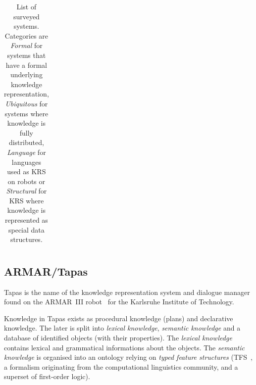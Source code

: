 \documentclass[a4paper, twocolumn]{article}
\begin{document}
\begin{landscape}
\begin{table}
\begin{center}
\begin{tabular}{p{2.2cm}p{1.6cm}p{4cm}lp{2.4cm}p{3.4cm}p{1.5cm}}

\bottomrule

\end{tabular}
\end{center}

\caption{List of surveyed systems. Categories are \emph{Formal} for systems
that have a formal underlying knowledge representation, \emph{Ubiquitous} for
systems where knowledge is fully distributed, \emph{Language} for languages
used as KRS on robots or \emph{Structural} for KRS where knowledge is
represented as special data structures.}

\label{table|surveyed-systems}
\end{table}
\end{landscape}


\subsection{ARMAR/Tapas}

{\sc Tapas} is the name of the knowledge representation system and dialogue
manager found on the ARMAR~III robot~\cite{Holzapfel2008} for the Karlsruhe
Institute of Technology.

Knowledge in {\sc Tapas} exists as procedural knowledge (plans) and declarative
knowledge. The later is split into \emph{lexical knowledge}, \emph{semantic
knowledge} and a database of identified objects (with their properties). The
\emph{lexical knowledge} contains lexical and grammatical informations about
the objects. The \emph{semantic knowledge} is organised into an ontology
relying on \emph{typed feature structures} (TFS~\cite{Carpenter1992}, a
formalism originating from the computational linguistics community, and a
superset of first-order logic).
\end{document}
